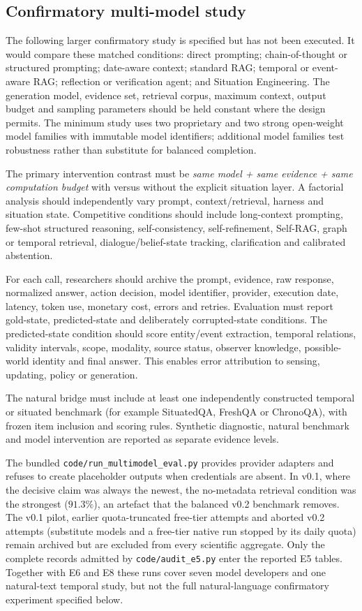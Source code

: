 \documentclass[Numbered]{sn-jnl}
\begin{document}
\subsection*{Confirmatory multi-model study}
The following larger confirmatory study is specified but has not been executed.
It would compare these matched conditions:
direct prompting; chain-of-thought or structured prompting; date-aware context;
standard RAG; temporal or event-aware RAG; reflection or verification agent; and
Situation Engineering. The generation model, evidence set, retrieval corpus,
maximum context, output budget and sampling parameters should be held constant
where the design permits. The minimum study uses two proprietary and two strong
open-weight model families with immutable model identifiers; additional model
families test robustness rather than substitute for balanced completion.

The primary intervention contrast must be
\emph{same model + same evidence + same computation budget} with versus without
the explicit situation layer. A factorial analysis should independently vary
prompt, context/retrieval, harness and situation state. Competitive conditions
should include long-context prompting, few-shot structured reasoning,
self-consistency, self-refinement, Self-RAG, graph or temporal retrieval,
dialogue/belief-state tracking, clarification and calibrated abstention.

For each call, researchers should archive the prompt, evidence, raw response,
normalized answer, action decision, model identifier, provider, execution date,
latency, token use, monetary cost, errors and retries. Evaluation must report
gold-state, predicted-state and deliberately corrupted-state conditions. The
predicted-state condition should score entity/event extraction, temporal
relations, validity intervals, scope, modality, source status, observer
knowledge, possible-world identity and final answer. This enables error
attribution to sensing, updating, policy or generation.

The natural bridge must include at least one independently constructed temporal
or situated benchmark (for example SituatedQA, FreshQA or ChronoQA), with frozen
item inclusion and scoring rules. Synthetic diagnostic, natural benchmark and
model intervention are reported as separate evidence levels.

The bundled \texttt{code/run\_multimodel\_eval.py} provides provider adapters and
refuses to create placeholder outputs when credentials are absent. In v0.1,
where the decisive claim was always the newest, the no-metadata retrieval
condition was the strongest ($91.3\%$), an artefact that the balanced v0.2
benchmark removes. The v0.1
pilot, earlier quota-truncated free-tier attempts and aborted v0.2 attempts
(substitute models and a free-tier native run stopped by its daily quota)
remain archived but are excluded from every scientific aggregate. Only the
complete records admitted by \texttt{code/audit\_e5.py} enter the reported E5
tables. Together with E6 and E8 these runs cover seven model developers and
one natural-text temporal study, but not the full natural-language
confirmatory experiment specified below.
\end{document}
